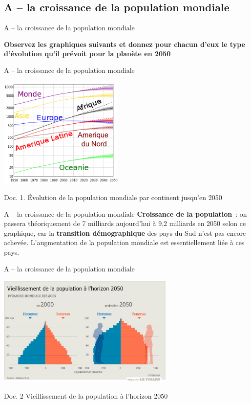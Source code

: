 \documentclass[C]{beamer}
\begin{document}
	\subsection*{A -- la croissance de la population mondiale}
	\begin{frame}{A -- la croissance de la population mondiale}
	\begin{center}
	\textbf{Observez les graphiques suivants et donnez pour chacun d'eux le type d'évolution qu'il prévoit pour la planète en 2050}
	\end{center}
	\end{frame}
	
	\begin{frame}{A -- la croissance de la population mondiale}
	\begin{center}
	\includegraphics[height=5.5cm]{images/image1.png}
	\end{center}
	Doc. 1. \'Evolution de la population mondiale par continent jusqu'en 2050
	\end{frame}
	
	\begin{frame}{A -- la croissance de la population mondiale}
	\textbf{Croissance de la population}~: on passera théoriquement de 7 milliards aujourd'hui à 9,2 milliards en 2050 selon ce graphique, car la \textbf{transition démographique} des pays du Sud n'est pas encore achevée. L'augmentation de la population mondiale est essentiellement liée à ces pays.
	\end{frame}
	
	\begin{frame}{A -- la croissance de la population mondiale}
	\begin{center}
	\includegraphics[height=5.5cm]{images/carte_1_12.jpg}
	\end{center}
	Doc. 2 Vieillissement de la population à l'horizon 2050
	\end{frame}
	
\end{document}
